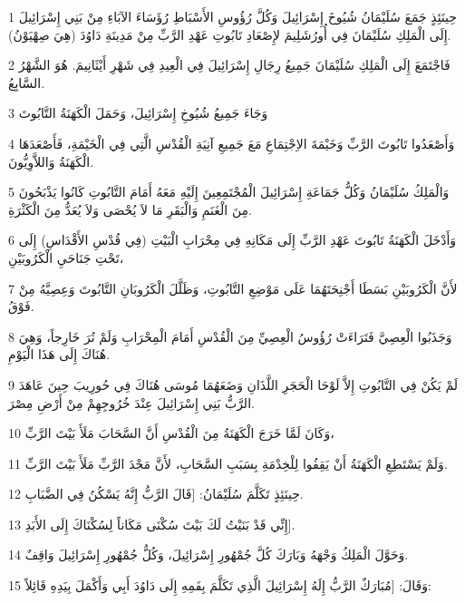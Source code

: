 \par 1 حِينَئِذٍ جَمَعَ سُلَيْمَانُ شُيُوخَ إِسْرَائِيلَ وَكُلَّ رُؤُوسِ الأَسْبَاطِ رُؤَسَاءَ الآبَاءِ مِنْ بَنِي إِسْرَائِيلَ إِلَى الْمَلِكِ سُلَيْمَانَ فِي أُورُشَلِيمَ لإِصْعَادِ تَابُوتِ عَهْدِ الرَّبِّ مِنْ مَدِينَةِ دَاوُدَ (هِيَ صِهْيَوْنُ).
\par 2 فَاجْتَمَعَ إِلَى الْمَلِكِ سُلَيْمَانَ جَمِيعُ رِجَالِ إِسْرَائِيلَ فِي الْعِيدِ فِي شَهْرِ أَيْثَانِيمَ. هُوَ الشَّهْرُ السَّابِعُ.
\par 3 وَجَاءَ جَمِيعُ شُيُوخِ إِسْرَائِيلَ، وَحَمَلَ الْكَهَنَةُ التَّابُوتَ
\par 4 وَأَصْعَدُوا تَابُوتَ الرَّبِّ وَخَيْمَةَ الاِجْتِمَاعِ مَعَ جَمِيعِ آنِيَةِ الْقُدْسِ الَّتِي فِي الْخَيْمَةِ، فَأَصْعَدَهَا الْكَهَنَةُ وَاللاَّوِيُّونَ.
\par 5 وَالْمَلِكُ سُلَيْمَانُ وَكُلُّ جَمَاعَةِ إِسْرَائِيلَ الْمُجْتَمِعِينَ إِلَيْهِ مَعَهُ أَمَامَ التَّابُوتِ كَانُوا يَذْبَحُونَ مِنَ الْغَنَمِ وَالْبَقَرِ مَا لاَ يُحْصَى وَلاَ يُعَدُّ مِنَ الْكَثْرَةِ.
\par 6 وَأَدْخَلَ الْكَهَنَةُ تَابُوتَ عَهْدِ الرَّبِّ إِلَى مَكَانِهِ فِي مِحْرَابِ الْبَيْتِ (فِي قُدْسِ الأَقْدَاسِ) إِلَى تَحْتِ جَنَاحَيِ الْكَرُوبَيْنِ،
\par 7 لأَنَّ الْكَرُوبَيْنِ بَسَطَا أَجْنِحَتَهُمَا عَلَى مَوْضِعِ التَّابُوتِ، وَظَلَّلَ الْكَرُوبَانِ التَّابُوتَ وَعِصِيَّهُ مِنْ فَوْقُ.
\par 8 وَجَذَبُوا الْعِصِيَّ فَتَرَاءَتْ رُؤُوسُ الْعِصِيِّ مِنَ الْقُدْسِ أَمَامَ الْمِحْرَابِ وَلَمْ تُرَ خَارِجاً، وَهِيَ هُنَاكَ إِلَى هَذَا الْيَوْمِ.
\par 9 لَمْ يَكُنْ فِي التَّابُوتِ إِلاَّ لَوْحَا الْحَجَرِ اللَّذَانِ وَضَعَهُمَا مُوسَى هُنَاكَ فِي حُورِيبَ حِينَ عَاهَدَ الرَّبُّ بَنِي إِسْرَائِيلَ عِنْدَ خُرُوجِهِمْ مِنْ أَرْضِ مِصْرَ.
\par 10 وَكَانَ لَمَّا خَرَجَ الْكَهَنَةُ مِنَ الْقُدْسِ أَنَّ السَّحَابَ مَلَأَ بَيْتَ الرَّبِّ،
\par 11 وَلَمْ يَسْتَطِعِ الْكَهَنَةُ أَنْ يَقِفُوا لِلْخِدْمَةِ بِسَبَبِ السَّحَابِ، لأَنَّ مَجْدَ الرَّبِّ مَلَأَ بَيْتَ الرَّبِّ.
\par 12 حِينَئِذٍ تَكَلَّمَ سُلَيْمَانُ: [قَالَ الرَّبُّ إِنَّهُ يَسْكُنُ فِي الضَّبَابِ.
\par 13 إِنِّي قَدْ بَنَيْتُ لَكَ بَيْتَ سُكْنَى مَكَاناً لِسُكْنَاكَ إِلَى الأَبَدِ].
\par 14 وَحَوَّلَ الْمَلِكُ وَجْهَهُ وَبَارَكَ كُلَّ جُمْهُورِ إِسْرَائِيلَ، وَكُلُّ جُمْهُورِ إِسْرَائِيلَ وَاقِفٌ.
\par 15 وَقَالَ: [مُبَارَكٌ الرَّبُّ إِلَهُ إِسْرَائِيلَ الَّذِي تَكَلَّمَ بِفَمِهِ إِلَى دَاوُدَ أَبِي وَأَكْمَلَ بِيَدِهِ قَائِلاً:
